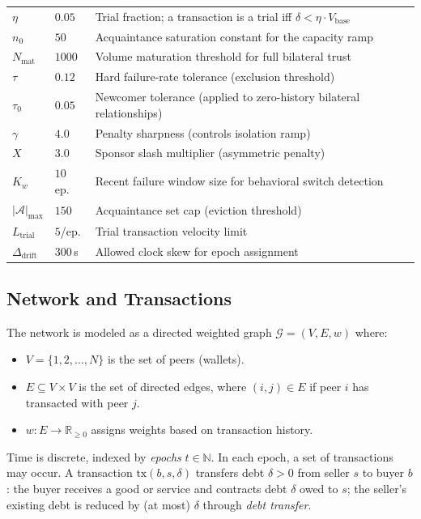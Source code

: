 \documentclass[11pt]{article}
\begin{document}
\begin{center}
\begin{tabular}{|l|l|p{7cm}|}
$\eta$ & $0.05$ & Trial fraction; a transaction is a trial iff $\delta < \eta \cdot V_{\text{base}}$ \\
$n_0$ & $50$ & Acquaintance saturation constant for the capacity ramp \\
$N_{\text{mat}}$ & $1000$ & Volume maturation threshold for full bilateral trust \\
$\tau$ & $0.12$ & Hard failure-rate tolerance (exclusion threshold) \\
$\tau_0$ & $0.05$ & Newcomer tolerance (applied to zero-history bilateral relationships) \\
$\gamma$ & $4.0$ & Penalty sharpness (controls isolation ramp) \\
$X$ & $3.0$ & Sponsor slash multiplier (asymmetric penalty) \\
$K_w$ & $10$ ep. & Recent failure window size for behavioral switch detection \\
$|\mathcal{A}|_{\max}$ & $150$ & Acquaintance set cap (eviction threshold) \\
$L_{\text{trial}}$ & $5$/ep. & Trial transaction velocity limit \\
$\Delta_{\text{drift}}$ & $300$\,s & Allowed clock skew for epoch assignment \\
\hline
\end{tabular}
\end{center}

\subsection{Network and Transactions}

The network is modeled as a directed weighted graph $\mathcal{G} = (V, E, w)$ where:
\begin{itemize}
    \item $V = \{1, 2, \ldots, N\}$ is the set of peers (wallets).
    \item $E \subseteq V \times V$ is the set of directed edges, where $(i, j) \in E$ if peer $i$ has transacted with peer $j$.
    \item $w: E \to \mathbb{R}_{\geq 0}$ assigns weights based on transaction history.
\end{itemize}

Time is discrete, indexed by \emph{epochs} $t \in \mathbb{N}$. In each epoch, a set of transactions may occur. A transaction $\text{tx}(b, s, \delta)$ transfers debt $\delta > 0$ from seller $s$ to buyer $b$: the buyer receives a good or service and contracts debt $\delta$ owed to $s$; the seller's existing debt is reduced by (at most) $\delta$ through \emph{debt transfer}.
\end{document}
